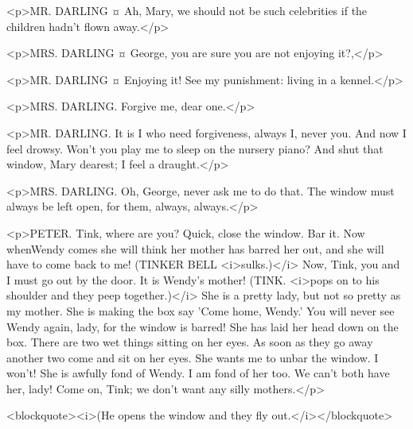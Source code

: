 <p>MR. DARLING ¤
Ah, Mary, we should not be such celebrities if the children hadn't flown away.</p>

<p>MRS. DARLING ¤
George, you are sure you are not enjoying it?,</p>

<p>MR. DARLING ¤
Enjoying it! See my punishment: living in a kennel.</p>

<p>MRS. DARLING. Forgive me, dear one.</p>

<p>MR. DARLING. It is I who need forgiveness, always I, never you. And now I feel drowsy.
Won't you play me to sleep on the nursery piano? And shut that window, Mary dearest; I feel a draught.</p>

<p>MRS. DARLING. Oh, George, never ask me to do that. The window must always be left open, for them, always, always.</p>


<p>PETER. Tink, where are you? Quick, close the window.
Bar it.
Now whenWendy comes she will think her mother has barred her out, and she will have to come back to me! (TINKER BELL <i>sulks.)</i> Now, Tink, you and I must go out by the door.
It is Wendy's mother! (TINK. <i>pops on to his shoulder and they peep together.)</i> She is a pretty lady, but not so pretty as my mother.
She is making the box say 'Come home, Wendy.' You will never see Wendy again, lady, for the window is barred!
She has laid her head down on the box. There are two wet things sitting on her eyes. As soon as they go away another two come and sit on her eyes.
She wants me to unbar the window. I won't! She is awfully fond of Wendy. I am fond of her too. We can't both have her, lady!
Come on, Tink; we don't want any silly mothers.</p>

<blockquote><i>(He opens the window and they fly out.</i></blockquote>

